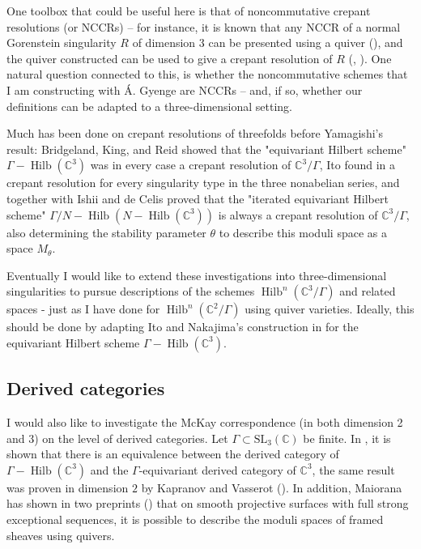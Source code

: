 \documentclass[11pt,a4paper ]{article}        %
\newcommand{\C}{\mathbb{C}}    						%
\newcommand{\Hilb}{\operatorname{Hilb}}
\begin{document}
One toolbox that could be useful here is that of noncommutative crepant resolutions (or NCCRs) -- for instance, it is known that any NCCR of a normal Gorenstein singularity $ R $ of dimension 3 can be presented using a quiver (\cite[Lemma 3.1]{CrawPaper}), and the quiver constructed can be used to give a crepant resolution of $ R $ (\cite[Theorem 3.7]{CrawPaper}, \cite[Theorem 6.3.1]{vdBergh}). One natural question connected to this, is whether the noncommutative schemes that I am constructing with \'A. Gyenge are NCCRs -- and, if so, whether our definitions can be adapted to a three-dimensional setting.

%

Much has been done on crepant resolutions of threefolds before Yamagishi's result: Bridgeland, King, and Reid showed \cite{BKR} that the "equivariant Hilbert scheme" $\Gamma-\Hilb(\C^3)$ was in every case a crepant resolution of $\C^3/\Gamma$,  Ito found in \cite{Itotrihedral, ItoOthers} a crepant resolution for every singularity type in the three nonabelian series, and together with Ishii and de Celis proved that the "iterated equivariant Hilbert scheme" $\Gamma/N-\Hilb(N-\Hilb(\C^3))$ is always a crepant resolution of $\C^3/\Gamma$, also determining the stability parameter $\theta$ to describe this moduli space as a space $M_\theta$. 

Eventually I would like to extend these investigations into three-dimensional singularities to pursue descriptions of the schemes $\Hilb^n(\C^3/\Gamma)$ and related spaces - just as I have done for $\Hilb^n(\C^2/\Gamma)$ using quiver varieties. Ideally, this should be done by adapting Ito and Nakajima's construction in \cite{ItoNakajima} for the equivariant Hilbert scheme $\Gamma-\Hilb(\C^3)$.%

\subsection*{Derived categories}
I would also like to investigate the McKay correspondence (in both dimension 2 and 3) on the level of derived categories. Let $\Gamma\subset \mathrm{SL}_3(\C)$ be finite. In \cite{BKR}, it is shown that there is an equivalence between the derived category of $ \Gamma-\Hilb(\C^3)$ and the $\Gamma$-equivariant derived category of $\C^3$, the same result was proven in dimension $2$ by Kapranov and Vasserot (\cite{KV}).
In addition, Maiorana has shown in two preprints (\cite{maiorana1, maiorana2}) that on smooth projective surfaces with full strong exceptional sequences, it is possible to describe the moduli spaces of framed sheaves using quivers.
\end{document}
